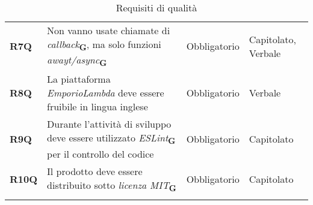 \begin{center}
\begin{longtable}[!h]{p{50px} p{200px} p{100px} p{50px}}
        \textbf{R7Q}                          & Non vanno usate chiamate di \textit{callback}\textsubscript{\textbf{G}}, ma solo funzioni \textit{awayt/async}\textsubscript{\textbf{G}}                                                                                 & Obbligatorio             & Capitolato, Verbale     \\
        \textbf{R8Q}                          & La piattaforma \textit{EmporioLambda} deve essere fruibile in lingua inglese                                                                                         & Obbligatorio             & Verbale \\
        \textbf{R9Q}                          & Durante l'attività di sviluppo deve essere utilizzato \textit{ESLint}\textsubscript{\textbf{G}} per il controllo del codice                                                                             & Obbligatorio             & Capitolato \\
        \textbf{R10Q}                         & Il prodotto deve essere distribuito sotto \textit{licenza MIT}\textsubscript{\textbf{G}}                                                                                      & Obbligatorio             & Capitolato \\
        \rowcolor{white}\caption{Requisiti di qualità}
    \end{longtable}
\end{center}

\newpage

